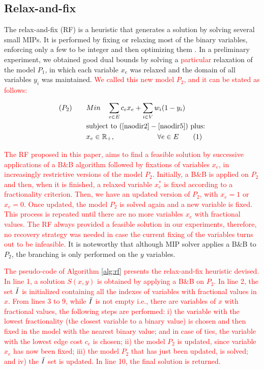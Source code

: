 \documentclass{ro}
\newcommand\numberthis{\addtocounter{equation}{1}\tag{\theequation}}
\begin{document}
\subsection{Relax-and-fix}

The relax-and-fix (RF) is a  heuristic  that  generates  a  solution  by  solving  several small MIPs. It is performed by fixing or relaxing most of the binary variables, enforcing only a few to be integer and then optimizing them \cite{toledo2015relax}. In a preliminary experiment, we obtained good dual bounds by solving a \textcolor{red}{particular} relaxation of the model $P_1$, in which each variable $x_e$  was relaxed and the domain of all  variables $y_i$ was maintained. \textcolor{red}{We called this new model $P_2$, and it can be stated as follows:}

\textcolor{red}{\begin{align*}
(P_2) \qquad	&Min \quad  \sum_{e \in E} c_e x_e + \sum_{i \in V} w_i (1 - y_i)  \\
&\text{subject to } (\ref{naodir2} - \ref{naodir5}) \text{ plus:}\\
	&x_e \in \mathbb{R_+}, \qquad \qquad \qquad \forall e \in E \label{xe-rl} \numberthis
\end{align*}
}

\textcolor{red}{
The RF proposed in this paper, aims to find a feasible solution by successive applications of a B\&B algorithm  followed by fixations  of variables $x_e$, in increasingly restrictive versions of the model $P_2$. Initially, a B\&B is applied on $P_2$ and then, when it is finished, a relaxed variable $x_e^*$ is fixed according to a fractionality criterion. Then, we have an updated version of $P_2$, with $x_e=1$ or $x_e=0$. Once updated, the model $P_2$ is solved again  and a new variable is fixed. This process is repeated until there are no more variables $x_e$ with fractional values. The RF always provided a feasible solution in our experiments, therefore, no recovery strategy was needed in case the current fixing of the variables turns out to be infeasible.} It is noteworthy that although MIP solver applies a B\&B to $P_2$, the branching is only performed on the $y$ variables.


\textcolor{red}{
The pseudo-code of Algorithm \ref{alg:rf} presents the relax-and-fix heuristic devised. In line 1, a solution $S(x, y)$ is obtained by applying a B\&B on $P_2$. In line 2, the set $\Bar{I}$ is initialized containing all the indexes of variables with fractional values in $x$. From lines 3 to 9, while $\Bar{I}$ is not empty i.e., there are variables of $x$ with fractional values, the following steps are performed: i) the variable with the lowest fractionality (the closest variable  to a binary value) is chosen and then fixed in the model with the nearest binary value; \textcolor{red}{and in case of ties, the variable with the lowest edge cost $c_e$ is chosen}; ii) the model $P_2$ is updated, since variable $x_e$ has now been fixed; iii) the model $P_2$ that has just been updated, is solved; and iv) the $\Bar{I}$ set is updated.  In line 10, the final solution is returned.}
\end{document}
